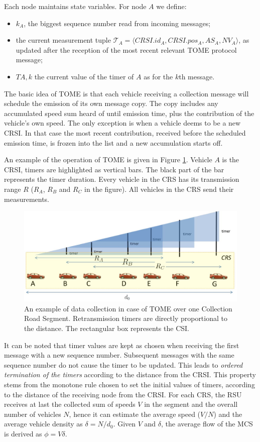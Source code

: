 \documentclass[conference]{IEEEtran}
\begin{document}
Each node maintains state variables. For node $A$ we define:
\begin{itemize}
 \item $k_A$, the biggest sequence number read from incoming messages;
  \item the current measurement tuple $\mathcal{T}_A=\langle CRSI.id_A,CRSI.pos_A,AS_A,NV_A \rangle$, as updated after the reception of the most recent relevant TOME protocol message;
  \item $T{A, k}$ the current value of the timer of $A$ as for the $k$th message.
  \end{itemize}

The basic idea of TOME is that each vehicle receiving a collection message will schedule the emission of its own message copy. The copy includes any accumulated speed sum heard of until emission time, plus the contribution of the vehicle's own speed. The only exception is when a vehicle deems to be a new CRSI. In that case the most recent contribution, received before the scheduled emission time, is frozen into the list and a new accumulation starts off.

An example of the operation of TOME is given in Figure \ref{fig:tome}. Vehicle $A$ is the CRSI, timers are highlighted as vertical bars. The black part of the bar represents the timer duration. Every vehicle in the CRS has its transmission range $R$ ($R_A$, $R_B$ and $R_C$ in the figure). All vehicles in the CRS send their measurements.

\begin{figure}[tbhp]
\begin{center}
\includegraphics[width=0.8\columnwidth]{fig/TOME.eps}
\caption{An example of data collection in case of TOME over one Collection Road Segment. Retransmission timers are directly proportional to the distance. The rectangular box represents the CSI.}
\label{fig:tome}
\end{center}
\end{figure}

It can be noted that timer values are kept as chosen when receiving the first message with a new sequence number. Subsequent messages with the same sequence number do not cause the timer to be updated. This leads to \emph{ordered termination of the timers} according to the distance from the CRSI. This property stems from the monotone rule chosen to set the initial values of timers, according to the distance of the receiving node from the CRSI. For each CRS, the RSU receives at last the collected sum of speeds $V$ in the segment and the overall number of vehicles $N$, hence it can estimate the average speed ($V/N$) and the average vehicle density as $\delta=N/d_0$. Given $V$ and $\delta$, the average flow of the MCS is derived as $\phi = V \delta$.
\end{document}
